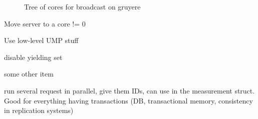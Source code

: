 \documentclass{article}
\begin{document}
\begin{figure}
  
  \caption{Tree of cores for broadcast on gruyere}
\end{figure}



\begin{itemize}
\item Move server to a core != 0
\item Use low-level UMP stuff
{
\renewcommand{\labelitemi}{\checkmark}
\item disable yielding set 
}
\item some other item
\item run several request in parallel, give them IDs, can use in the
  measurement struct. Good for everything having transactions (DB,
  transactional memory, consistency in replication systems)
\end{itemize}

\newpage



\label{LastPage}
\end{document}
